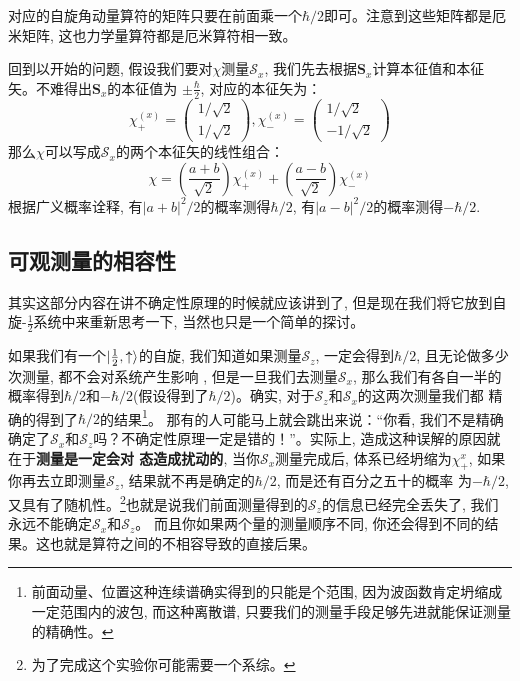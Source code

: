 \documentclass[a4paper,zihao=-4,linespread=1]{ctexrep}
\begin{document}
    对应的自旋角动量算符的矩阵只要在前面乘一个$\hbar/2$即可。注意到这些矩阵都是厄米矩阵, 这也力学量算符都是厄米算符相一致。
    
    回到以开始的问题, 假设我们要对$\chi$测量$\mathcal{S}_x$, 我们先去根据$\mathbf{S}_x$计算本征值和本征矢。不难得出$\mathbf{S}_x$的本征值为
    $\pm\frac{\hbar}{2}$, 对应的本征矢为：
    \begin{equation}
        \chi_+^{(x)}=\begin{pmatrix}
            1/\sqrt{2}\\
            1/\sqrt{2}
        \end{pmatrix},
        \chi_-^{(x)}=\begin{pmatrix}
            1/\sqrt{2}\\
            -1/\sqrt{2}
        \end{pmatrix}
    \end{equation}
    那么$\chi$可以写成$\mathcal{S}_x$的两个本征矢的线性组合：
    \begin{equation}
        \chi=\left(\frac{a+b}{\sqrt{2}}\right) \chi_{+}^{(x)}+\left(\frac{a-b}{\sqrt{2}}\right) \chi_{-}^{(x)}
    \end{equation}
    根据广义概率诠释, 有$|a+b|^2/2$的概率测得$\hbar/2$, 有$|a-b|^2/2$的概率测得$-\hbar/2$.

    \subsection{可观测量的相容性}
    其实这部分内容在讲不确定性原理的时候就应该讲到了, 但是现在我们将它放到自旋-$\frac{1}{2}$系统中来重新思考一下, 当然也只是一个简单的探讨。

    如果我们有一个$\ket{\frac{1}{2},\uparrow}$的自旋, 我们知道如果测量$\mathcal{S}_z$, 一定会得到$\hbar/2$, 且无论做多少次测量, 都不会对系统产生影响
    , 但是一旦我们去测量$\mathcal{S}_x$, 那么我们有各自一半的概率得到$\hbar/2$和$-\hbar/2$(假设得到了$\hbar/2$)。确实, 对于$\mathcal{S}_z$和$\mathcal{S}_x$的这两次测量我们都
    精确的得到了$\hbar/2$的结果\footnote{前面动量、位置这种连续谱确实得到的只能是个范围, 因为波函数肯定坍缩成一定范围内的波包, 而这种离散谱, 只要我们的测量手段足够先进就能保证测量的精确性。}。
    那有的人可能马上就会跳出来说：“你看, 我们不是精确确定了$\mathcal{S}_x$和$\mathcal{S}_z$吗？不确定性原理一定是错的！”。实际上, 造成这种误解的原因就在于\textbf{测量是一定会对
    态造成扰动的}, 当你$\mathcal{S}_x$测量完成后, 体系已经坍缩为$\chi_{+}^x$, 如果你再去立即测量$\mathcal{S}_z$, 结果就不再是确定的$\hbar/2$, 而是还有百分之五十的概率
    为$-\hbar/2$, 又具有了随机性。\footnote{为了完成这个实验你可能需要一个系综。}也就是说我们前面测量得到的$\mathcal{S}_z$的信息已经完全丢失了, 我们永远不能确定$\mathcal{S}_x$和$\mathcal{S}_z$。
    而且你如果两个量的测量顺序不同, 你还会得到不同的结果。这也就是算符之间的不相容导致的直接后果。
\end{document}
